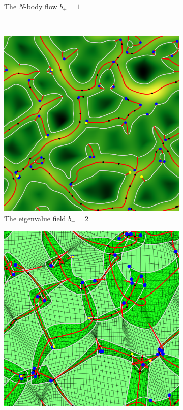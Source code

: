 \documentclass[a4paper, 11pt]{article}
\begin{document}
\begin{figure}
\begin{subfigure}[b]{0.32\textwidth}
\caption{The $N$-body flow $b_+=1$}
\label{fig:Nbody_1}
\end{subfigure}\\
\begin{subfigure}[b]{0.32\textwidth}
\includegraphics[width=\textwidth]{Visual_Lambda1_D=2}
\caption{The eigenvalue field $b_+=2$}
\label{fig:eigen1_2}
\end{subfigure}
\begin{subfigure}[b]{0.32\textwidth}
\includegraphics[width=\textwidth]{Visual_Zeldovich_D=2}

\end{subfigure}
\end{figure}
\end{document}
